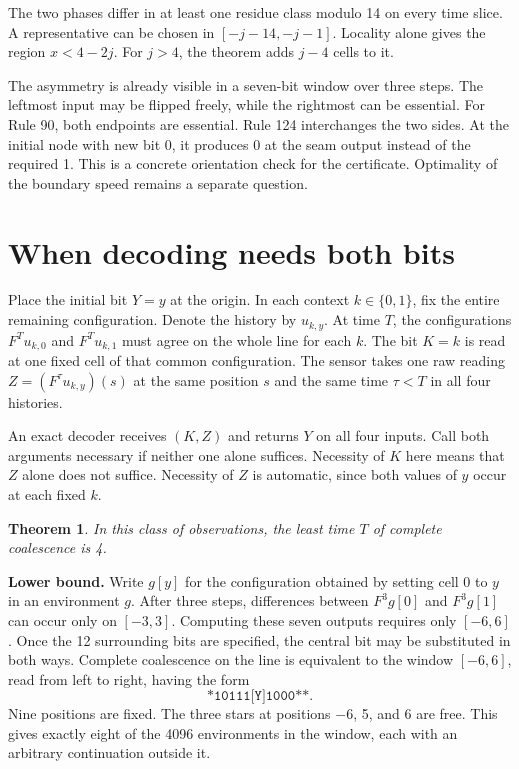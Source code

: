 \documentclass[11pt,a4paper]{article}
\theoremstyle{compact}
\newtheorem{theorem}{Theorem}
\begin{document}
The two phases differ in at least one residue class modulo 14 on every time
slice. A representative can be chosen in $[-j-14,-j-1]$. Locality alone gives
the region $x<4-2j$. For $j>4$, the theorem adds $j-4$ cells to it.

The asymmetry is already visible in a seven-bit window over three steps. The
leftmost input may be flipped freely, while the rightmost can be essential.
For Rule 90, both endpoints are essential. Rule 124 interchanges the two sides.
At the initial node with new bit 0, it produces 0 at the seam output instead of
the required 1. This is a concrete orientation check for the certificate.
Optimality of the boundary speed remains a separate question.

\section{When decoding needs both bits}

Place the initial bit $Y=y$ at the origin. In each context $k\in\{0,1\}$, fix
the entire remaining configuration. Denote the history by $u_{k,y}$. At time
$T$, the configurations $F^Tu_{k,0}$ and $F^Tu_{k,1}$ must agree on the whole
line for each $k$. The bit $K=k$ is read at one fixed cell of that common
configuration. The sensor takes one raw reading
$Z=(F^\tau u_{k,y})(s)$ at the same position $s$ and the same time $\tau<T$ in
all four histories.

An exact decoder receives $(K,Z)$ and returns $Y$ on all four inputs. Call both
arguments necessary if neither one alone suffices. Necessity of $K$ here means
that $Z$ alone does not suffice. Necessity of $Z$ is automatic, since both
values of $y$ occur at each fixed $k$.

\begin{theorem}\label{thm:threshold}
In this class of observations, the least time $T$ of complete coalescence is 4.
\end{theorem}

\noindent\textbf{Lower bound.}
Write $g[y]$ for the configuration obtained by setting cell 0 to $y$ in an
environment $g$. After three steps, differences between $F^3g[0]$ and
$F^3g[1]$ can occur only on $[-3,3]$. Computing these seven outputs requires
only $[-6,6]$. Once the 12 surrounding bits are specified, the central bit may
be substituted in both ways. Complete coalescence on the line is equivalent to
the window $[-6,6]$, read from left to right, having the form
\[
 \texttt{*10111[Y]1000**}.
\]
Nine positions are fixed. The three stars at positions $-6$, 5, and 6 are
free. This gives exactly eight of the 4096 environments in the window, each
with an arbitrary continuation outside it.
\end{document}
